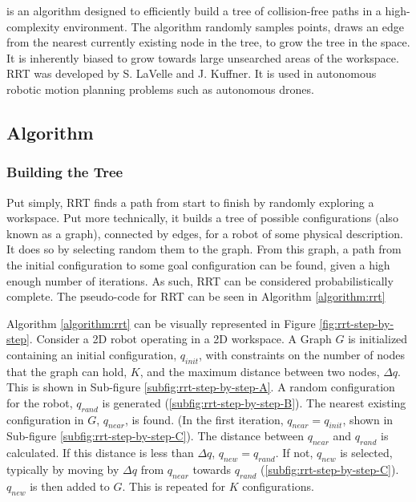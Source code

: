 
 is an algorithm designed to efficiently build a tree of collision-free paths in a high-complexity environment. The algorithm randomly samples points, draws an edge from the nearest currently existing node in the tree, to grow the tree in the space. It is inherently biased to grow towards large unsearched areas of the workspace. RRT was developed by S. LaVelle\cite{LaValle1998} and J. Kuffner\cite{LaValle2001}. It is used in autonomous robotic motion planning problems such as autonomous drones.

\subsection{Algorithm}

    \subsubsection{Building the Tree}

        Put simply, \gls{RRT} finds a path from start to finish by randomly exploring a workspace.
        Put more technically, it builds a tree of possible \glspl{configuration} (also known as a graph), connected by edges, for a robot of some physical description. It does so by selecting random them to the graph. 
        From this graph, a path from the initial \gls{configuration} to some goal \gls{configuration} can be found, given a high enough number of iterations. As such, \gls{RRT} can be considered \gls{probabilistically complete}.
        The pseudo-code for \gls{RRT} can be seen in Algorithm \ref{algorithm:rrt}
        
        

        Algorithm \ref{algorithm:rrt} can be visually represented in Figure \ref{fig:rrt-step-by-step}. Consider a \gls{2D} robot operating in a \gls{2D} workspace. A Graph $G$ is initialized containing an initial \gls{configuration}, $q_{init}$, with constraints on the number of nodes that the graph can hold, $K$, and the maximum distance between two nodes, $\Delta q$. This is shown in Sub-figure \ref{subfig:rrt-step-by-step-A}. A random \gls{configuration} for the robot, $q_{rand}$ is generated (\ref{subfig:rrt-step-by-step-B}). The nearest existing \gls{configuration} in $G$, $q_{near}$, is found. (In the first iteration, $q_{near} = q_{init}$, shown in Sub-figure \ref{subfig:rrt-step-by-step-C}). The distance between $q_{near}$ and $q_{rand}$ is calculated. If this distance is less than $\Delta q$, $q_{new} = q_{rand}$. If not, $q_{new}$ is selected, typically by moving by $\Delta q$ from $q_{near}$ towards $q_{rand}$ (\ref{subfig:rrt-step-by-step-C}). $q_{new}$ is then added to $G$. This is repeated for $K$ \gls{configuration}s.

